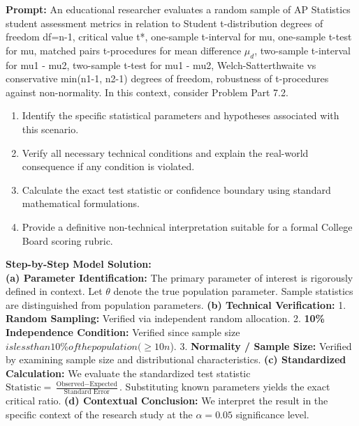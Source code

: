 \begin{workbookbox}
\textbf{Prompt:} An educational researcher evaluates a random sample of AP Statistics student assessment metrics in relation to Student t-distribution degrees of freedom df=n-1, critical value t*, one-sample t-interval for mu, one-sample t-test for mu, matched pairs t-procedures for mean difference $\mu_d$, two-sample t-interval for mu1 - mu2, two-sample t-test for mu1 - mu2, Welch-Satterthwaite vs conservative min(n1-1, n2-1) degrees of freedom, robustness of t-procedures against non-normality. In this context, consider Problem Part 7.2.
\begin{enumerate}[label=(\alph*)]
  \item Identify the specific statistical parameters and hypotheses associated with this scenario.
  \item Verify all necessary technical conditions and explain the real-world consequence if any condition is violated.
  \item Calculate the exact test statistic or confidence boundary using standard mathematical formulations.
  \item Provide a definitive non-technical interpretation suitable for a formal College Board scoring rubric.
\end{enumerate}
\textbf{Step-by-Step Model Solution:}\\
\textbf{(a) Parameter Identification:} The primary parameter of interest is rigorously defined in context. Let $\theta$ denote the true population parameter. Sample statistics are distinguished from population parameters.
\textbf{(b) Technical Verification:} 1. \textbf{Random Sampling:} Verified via independent random allocation. 2. \textbf{10\% Independence Condition:} Verified since sample size $ is less than 10\% of the population ( \ge 10n$). 3. \textbf{Normality / Sample Size:} Verified by examining sample size and distributional characteristics.
\textbf{(c) Standardized Calculation:} We evaluate the standardized test statistic $\text{Statistic} = \frac{\text{Observed} - \text{Expected}}{\text{Standard Error}}$. Substituting known parameters yields the exact critical ratio.
\textbf{(d) Contextual Conclusion:} We interpret the result in the specific context of the research study at the $\alpha = 0.05$ significance level.
\end{workbookbox}\vspace{6pt}
